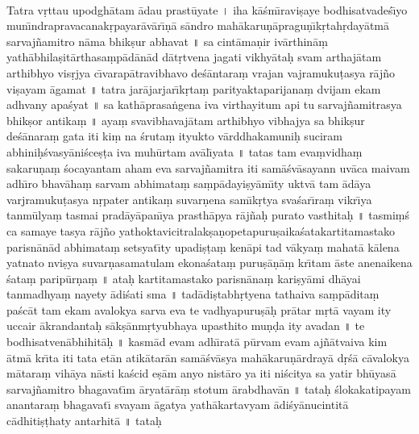 \documentclass[a4paper, 11pt, oneside, french]{article}
\begin{document}
\paragraph{}
Tatra v\d{r}ttau upodgh\={a}tam \={a}dau prast\={u}yate \texthindi{।} iha k\={a}\'{s}m\={\i}ravi\d{s}aye bodhisatvade\'{s}\={\i}yo mun\={\i}ndrapravacanak\d{r}payar\={a}v\={a}r\={\i}\d{n}\={a} s\={a}ndro mah\={a}karu\d{n}\={a}pragu\d{n}\={\i}k\d{r}tah\d{r}day\={a}tm\={a} sarvaj\~{n}amitro n\={a}ma bhik\d{s}ur abhavat \texthindi{॥} sa cint\={a}ma\d{n}ir iv\={a}rthin\={a}\d{m} yath\={a}bhila\d{s}it\={a}rthasa\d{m}p\={a}d\={a}n\={a}d d\={a}t\d{r}tvena jagati vikhy\={a}ta\d{h} svam arthaj\={a}tam arthibhyo vis\d{r}jya c\={\i}varap\={a}travibhavo de\'{s}\={a}ntara\d{m} vrajan vajramuku\d{t}asya r\={a}j\~{n}o vi\d{s}ayam \={a}gamat \texthindi{॥} tatra jar\={a}jarjar\={\i}k\d{r}ta\d{m} parityaktaparijana\d{m} dvijam ekam adhvany apa\'{s}yat \texthindi{॥} sa kath\={a}prasa\.{n}gena iva virthayitum api tu sarvaj\~{n}amitrasya bhik\d{s}or antika\d{m} \texthindi{॥} aya\d{m} svavibhavaj\={a}tam arthibhyo vibhajya sa bhik\d{s}ur de\'{s}\={a}nara\d{m} gata iti ki\d{m} na \'{s}ruta\d{m} ityukto v\={a}rddhakamuni\d{h} suciram abhini\d{h}\'{s}vasy\={a}ni\'{s}ce\d{s}\d{t}a iva muh\={u}rtam av\={a}l\={\i}yata \texthindi{॥} tatas tam eva\d{m}vidha\d{m} sakaru\d{n}a\d{m} \'{s}ocayantam aham eva sarvaj\~{n}amitra iti sam\={a}\'{s}v\={a}sayann uv\={a}ca maivam adh\={\i}ro bhav\={a}ha\d{m} sarvam abhimata\d{m} sa\d{m}p\={a}dayi\d{s}y\={a}m\={\i}ty uktv\={a} tam \={a}d\={a}ya varjramuku\d{t}asya n\d{r}pater antika\d{m} suvar\d{n}ena sam\={\i}k\d{r}tya sva\'{s}ar\={\i}ra\d{m} vikr\={\i}ya tanm\={u}lya\d{m} tasmai prad\={a}y\={a}pan\={\i}ya prasth\={a}pya r\={a}j\~{n}a\d{h} purato vasthita\d{h} \texthindi{॥} tasmi\d{m}\'{s} ca samaye tasya r\={a}j\~{n}o yathoktavicitralak\d{s}a\d{n}opetapuru\d{s}aika\'{s}atakartitamastako parisn\={a}n\={a}d abhimata\d{m} setsyat\={\i}ty upadi\d{s}\d{t}a\d{m} ken\={a}pi tad v\={a}kya\d{m} mahat\={a} k\={a}lena yatnato nvi\d{s}ya suvar\d{n}asamatulam ekona\'{s}ata\d{m} puru\d{s}\={a}\d{n}\={a}\d{m} kr\={\i}tam \={a}ste anenaikena \'{s}ata\d{m} parip\={u}r\d{n}a\d{m} \texthindi{॥} ata\d{h} kartitamastako parisn\={a}na\d{m} kari\d{s}y\={a}mi dh\={a}yai tanmadhya\d{m} nayety \={a}di\'{s}ati sma \texthindi{॥} tad\={a}di\d{s}tabh\d{r}tyena tathaiva sa\d{m}p\={a}dita\d{m} pa\'{s}c\={a}t tam ekam avalokya sarva eva te vadhyapuru\d{s}\={a}\d{h} pr\={a}tar m\d{r}t\={a} vayam ity uccair \={a}krandanta\d{h} s\={a}k\d{s}\={a}nm\d{r}tyubhaya upasthito mu\d{n}\d{d}a ity avadan \texthindi{॥} te bodhisatven\={a}bhihit\={a}\d{h} \texthindi{॥} kasm\={a}d evam adh\={\i}rat\={a} p\={u}rvam evam aj\~{n}\={a}tvaiva kim \={a}tm\={a} kr\={\i}ta iti tata et\={a}n atik\={a}tar\={a}n sam\={a}\'{s}v\={a}sya mah\={a}karu\d{n}\={a}rdray\={a} d\d{r}\'{s}\={a} c\={a}valokya m\={a}tara\d{m} vih\={a}ya n\={a}sti ka\'{s}cid e\d{s}\={a}m anyo nist\={a}ro ya iti ni\'{s}citya sa yatir bh\={u}yas\={a} sarvaj\~{n}amitro bhagavat\={\i}m \={a}ryat\={a}r\={a}\d{m} stotum \={a}rabdhav\={a}n \texthindi{॥} tata\d{h} \'{s}lokakatipayam anantara\d{m} bhagavat\={\i} svayam \={a}gatya yath\={a}kartavyam \={a}di\'{s}y\={a}nucintit\={a} c\={a}dhiti\d{s}\d{t}haty antarhit\={a} \texthindi{॥} tata\d{h} 
\end{document}
